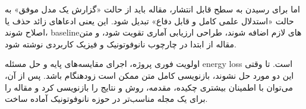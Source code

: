 اما برای رسیدن به سطح قابل انتشار، مقاله باید از حالت «گزارش یک مدل موفق» به حالت «استدلال علمی کامل و قابل دفاع» تبدیل شود. این یعنی ادعاهای زائد حذف یا اصلاح شوند، baselineهای لازم اضافه شوند، طراحی ارزیابی آماری تقویت شود، و متن مقاله از ابتدا در چارچوب نانوفوتونیک و فیزیک کاربردی نوشته شود.

اولویت فوری پروژه، اجرای مقایسه‌های پایه و حل مسئله energy loss است. تا وقتی این دو مورد حل نشوند، بازنویسی کامل متن ممکن است زودهنگام باشد. پس از آن، می‌توان با اطمینان بیشتری چکیده، مقدمه، روش و نتایج را بازنویسی کرد و مقاله را برای یک مجله مناسب‌تر در حوزه نانوفوتونیک آماده ساخت.
